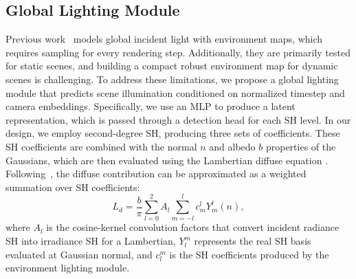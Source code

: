 \documentclass[letterpaper, 10 pt, conference]{ieeeconf}  %
\begin{document}
\subsection{Global Lighting Module}
Previous work~\cite{gao2024relightable,yao2022neilf} models global incident light with environment maps, which requires sampling for every rendering step. Additionally, they are primarily tested for static scenes, and building a compact robust environment map for dynamic scenes is challenging.
%
To address these limitations, we propose a global lighting module that predicts scene illumination conditioned on normalized timestep and camera embeddings.
%
Specifically, we use an MLP to produce a latent representation, which is passed through a detection head for each SH level.
In our design, we employ second-degree SH, producing three sets of coefficients.
These SH coefficients are combined with the normal $n$ and albedo $b$ properties of the Gaussians, which are then evaluated using the Lambertian diffuse equation \cite{cohen1993radiosity}. Following~\cite{green2003spherical}, the diffuse contribution can be approximated as a weighted summation over SH coefficients:
\begin{equation}
    L_d = \frac{b}{\pi}\sum_{l=0}^{2}A_{l}\sum_{m=-l}^{l}c^{l}_{m}Y^{l}_{m}(n),
    \label{Diffuse}
\end{equation}
where $A_l$ is the cosine-kernel convolution factors that convert incident radiance SH into irradiance SH for a Lambertian, $Y_{l}^{m}$ represents the real SH basis evaluated at Gaussian normal, and $c_{l}^{m}$ is the SH coefficients produced by the environment lighting module.
\end{document}
